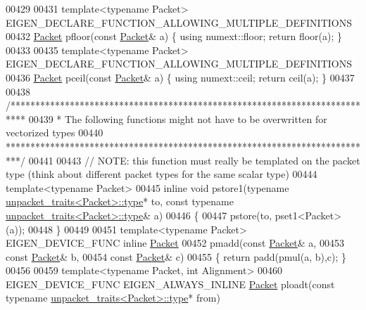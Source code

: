 \begin{DoxyCode}
{00429 
00431 \textcolor{keyword}{template}<\textcolor{keyword}{typename} Packet> EIGEN\_DECLARE\_FUNCTION\_ALLOWING\_MULTIPLE\_DEFINITIONS
00432 \hyperlink{union_eigen_1_1internal_1_1_packet}{Packet} pfloor(\textcolor{keyword}{const} \hyperlink{union_eigen_1_1internal_1_1_packet}{Packet}& a) \{ \textcolor{keyword}{using} numext::floor; \textcolor{keywordflow}{return} floor(a); \}
00433 
00435 \textcolor{keyword}{template}<\textcolor{keyword}{typename} Packet> EIGEN\_DECLARE\_FUNCTION\_ALLOWING\_MULTIPLE\_DEFINITIONS
00436 \hyperlink{union_eigen_1_1internal_1_1_packet}{Packet} pceil(\textcolor{keyword}{const} \hyperlink{union_eigen_1_1internal_1_1_packet}{Packet}& a) \{ \textcolor{keyword}{using} numext::ceil; \textcolor{keywordflow}{return} ceil(a); \}
00437 
00438 \textcolor{comment}{/***************************************************************************}
00439 \textcolor{comment}{* The following functions might not have to be overwritten for vectorized types}
00440 \textcolor{comment}{***************************************************************************/}
00441 
00443 \textcolor{comment}{// NOTE: this function must really be templated on the packet type (think about different packet types for
       the same scalar type)}
00444 \textcolor{keyword}{template}<\textcolor{keyword}{typename} Packet>
00445 \textcolor{keyword}{inline} \textcolor{keywordtype}{void} pstore1(\textcolor{keyword}{typename} \hyperlink{union_eigen_1_1internal_1_1_packet}{unpacket\_traits<Packet>::type}* to, \textcolor{keyword}{const} \textcolor{keyword}{typename}
       \hyperlink{union_eigen_1_1internal_1_1_packet}{unpacket\_traits<Packet>::type}& a)
00446 \{
00447   pstore(to, pset1<Packet>(a));
00448 \}
00449 
00451 \textcolor{keyword}{template}<\textcolor{keyword}{typename} Packet> EIGEN\_DEVICE\_FUNC \textcolor{keyword}{inline} \hyperlink{union_eigen_1_1internal_1_1_packet}{Packet}
00452 pmadd(\textcolor{keyword}{const} \hyperlink{union_eigen_1_1internal_1_1_packet}{Packet}&  a,
00453          \textcolor{keyword}{const} \hyperlink{union_eigen_1_1internal_1_1_packet}{Packet}&  b,
00454          \textcolor{keyword}{const} \hyperlink{union_eigen_1_1internal_1_1_packet}{Packet}&  c)
00455 \{ \textcolor{keywordflow}{return} padd(pmul(a, b),c); \}
00456 
00459 \textcolor{keyword}{template}<\textcolor{keyword}{typename} Packet, \textcolor{keywordtype}{int} Alignment>
00460 EIGEN\_DEVICE\_FUNC EIGEN\_ALWAYS\_INLINE \hyperlink{union_eigen_1_1internal_1_1_packet}{Packet} ploadt(\textcolor{keyword}{const} \textcolor{keyword}{typename} 
      \hyperlink{union_eigen_1_1internal_1_1_packet}{unpacket\_traits<Packet>::type}* from)
}
\end{DoxyCode}
